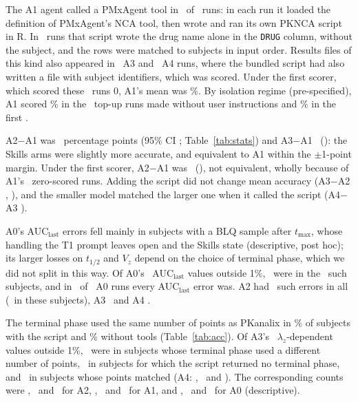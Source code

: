 \documentclass[11pt]{article}
\begin{document}
The A1 agent called a PMxAgent tool in \numToneAonePmxRuns\ of \numToneAonePmxKnown\ runs: in each run it loaded the
definition of PMxAgent's NCA tool, then wrote and ran its own PKNCA script in R. In \numToneAoneRowOrder\ runs that
script wrote the drug name alone in the \texttt{DRUG} column, without the subject, and the rows were matched to subjects
in input order. Results files of this kind also appeared in \numToneAthreeDrugOnly\ A3 and \numToneAfourDrugOnly\ A4
runs, where the bundled script had also written a file with subject identifiers, which was scored. Under the first
scorer, which scored these \numToneAoneRowOrder\ runs 0, A1's mean was \numToneAoneAccVone\%. By isolation regime (pre-specified), A1
scored \numToneAoneAccIsolated\% in the \numToneAoneNIsolated\ top-up runs made without user instructions and
\numToneAoneAccUser\% in the first \numToneAoneNUser.

A2$-$A1 was \numToneAtwoVsAoneDiff\ percentage points (95\% CI \numToneAtwoVsAoneCI; Table~\ref{tab:stats}) and A3$-$A1
\numToneAthreeVsAoneDiff\ (\numToneAthreeVsAoneCI): the Skills arms were slightly more accurate, and equivalent to A1
within the $\pm$1-point margin. Under the first scorer, A2$-$A1 was \numToneAtwoVsAoneVoneDiff\
(\numToneAtwoVsAoneVoneCI), not equivalent, wholly because of A1's \numToneAoneRowOrder\ zero-scored runs. Adding the script did not
change mean accuracy (A3$-$A2 \numToneAthreeVsAtwoDiff, \numToneAthreeVsAtwoCI), and the smaller model matched the
larger one when it called the script (A4$-$A3 \numToneAfourVsAthreeDiff).

A0's AUC$_\mathrm{last}$ errors fell mainly in subjects with a BLQ sample after $t_\mathrm{max}$, whose handling the
T1 prompt leaves open and the Skills state (descriptive, post hoc); its larger losses on $t_{1/2}$ and $V_z$ depend on
the choice of terminal phase, which we did not split in this way. Of A0's \numToneAzeroBlqErr\ AUC$_\mathrm{last}$ values outside 1\%,
\numToneAzeroBlqErrIn\ were in the \numToneBlqSubjects\ such subjects, and in \numToneAzeroBlqRunsAll\ of
\numToneAzeroBlqRunsErr\ A0 runs every AUC$_\mathrm{last}$ error was. A2 had \numToneAtwoBlqErr\ such errors in all
(\numToneAtwoBlqErrIn\ in these subjects), A3 \numToneAthreeBlqErr\ and A4 \numToneAfourBlqErr.

The terminal phase used the same number of points as PKanalix in \numToneAthreeNptsMatch\% of subjects with the
script and \numToneAzeroNptsMatch\% without tools (Table~\ref{tab:acc}). Of A3's \numToneAthreeLzErr\
$\lambda_z$-dependent values outside 1\%, \numToneAthreeLzErrDiffer\ were in subjects whose terminal phase used a
different number of points, \numToneAthreeLzErrNone\ in subjects for which the script returned no terminal phase, and
\numToneAthreeLzErrMatch\ in subjects whose points matched (A4: \numToneAfourLzErrDiffer, \numToneAfourLzErrNone\ and
\numToneAfourLzErrMatch). The corresponding counts were
\numToneAtwoLzErrDiffer, \numToneAtwoLzErrNone\ and \numToneAtwoLzErrMatch\ for A2, \numToneAoneLzErrDiffer,
\numToneAoneLzErrNone\ and \numToneAoneLzErrMatch\ for A1, and \numToneAzeroLzErrDiffer, \numToneAzeroLzErrNone\ and
\numToneAzeroLzErrMatch\ for A0 (descriptive).
\end{document}
